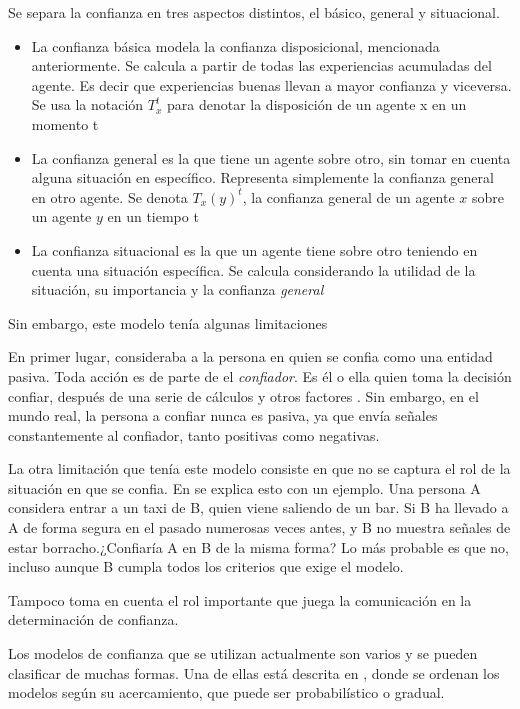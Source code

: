 Se separa la confianza en tres aspectos distintos, el básico, general y situacional. 

\begin{itemize}
\item{La confianza básica modela la confianza disposicional, mencionada anteriormente. Se calcula a partir de todas las experiencias acumuladas del agente. Es decir que experiencias buenas llevan a mayor confianza y viceversa. Se usa la notación $T_x^t$ para denotar la disposición de un agente x en un momento t}
\item{La confianza general es la que tiene un agente sobre otro, sin tomar en cuenta alguna situación en específico. Representa simplemente la confianza general en otro agente. Se denota $T_x(y)^t$, la confianza general de un agente $x$ sobre un agente $y$ en un tiempo t }

\item{La confianza situacional es la que un agente tiene sobre otro teniendo en cuenta una situación específica. Se calcula considerando la utilidad de la situación, su importancia y la confianza \textit{general}}

\end{itemize}

Sin embargo, este modelo tenía algunas limitaciones \cite{Medic2012}

En primer lugar, consideraba a la persona en quien se confia como una entidad pasiva. Toda acción es de parte de el \textit{confiador}. Es él o ella quien toma la decisión confiar, después de una serie de cálculos y otros factores . Sin embargo, en el mundo real, la persona a confiar nunca es pasiva, ya que envía señales constantemente al confiador, tanto positivas como negativas. 

La otra limitación que tenía este modelo consiste en que no se captura el rol de la situación en que se confia. En \citep{Medic2012} se explica esto con un ejemplo. Una persona A considera entrar a un taxi de B, quien viene saliendo de un bar. Si B ha llevado a A de forma segura en el pasado numerosas veces antes, y B no muestra señales de estar borracho.¿Confiaría A en B de la misma forma? Lo más probable es que no, incluso aunque B cumpla todos los criterios que exige el modelo.

Tampoco toma en cuenta el rol importante que juega la comunicación en la determinación de confianza.

 Los modelos de confianza que se utilizan actualmente son varios y se pueden clasificar de muchas formas. Una de ellas está descrita en \cite{Victor}, donde se ordenan los modelos según su acercamiento, que puede ser probabilístico o gradual. 

